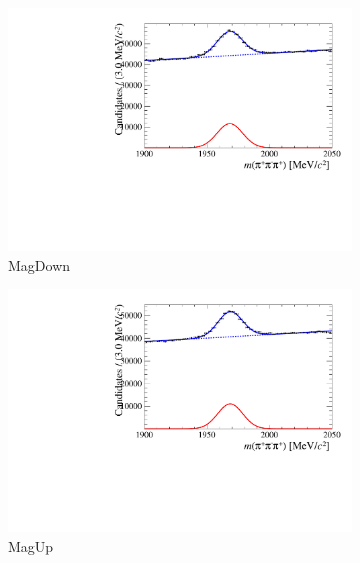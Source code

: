 \begin{figure}[!h]
\begin{subfigure}[t]{0.4\textwidth}
      \includegraphics[width=1.0\textwidth]{figs/Selection/Fit_Data_Bs02DsPi_Ds2PiPiPi_2016_MagDown_PreSel.pdf}
      \caption{\decay{\Dsp}{\pip\pim\pip} MagDown}
   \end{subfigure}
   \begin{subfigure}[t]{0.4\textwidth}
      \centering
      \includegraphics[width=1.0\textwidth]{figs/Selection/Fit_Data_Bs02DsPi_Ds2PiPiPi_2016_MagUp_PreSel.pdf}
      \caption{\decay{\Dsp}{\pip\pim\pip} MagUp}
   \end{subfigure}
   \begin{subfigure}[t]{0.4\textwidth}
      \centering

\end{subfigure}
\end{figure}
